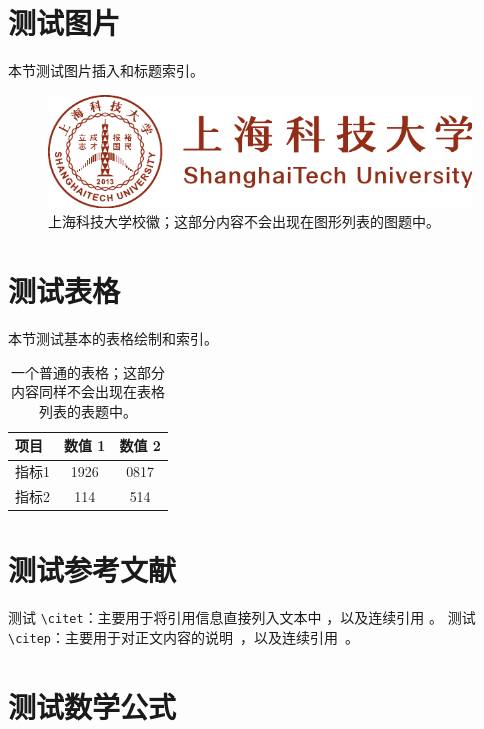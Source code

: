 \documentclass[
  fontset = mac,
]{shtthesis}
\begin{document}
\section{测试图片}
本节测试图片插入和标题索引。

\begin{figure}[htb]
  \centering
  \includegraphics[width=0.75\columnwidth]{shanghaitech-logo.pdf}
  \caption[上海科技大学校徽]{上海科技大学校徽；这部分内容不会出现在图形列表的图题中。}
\end{figure}

\section{测试表格}
本节测试基本的表格绘制和索引。

\begin{table}[htb]
  \centering
  \caption[一个普通的表格]{一个普通的表格；这部分内容同样不会出现在表格列表的表题中。}
  \begin{tabular}{lcc}
    \hline
    项目 & 数值 1 & 数值 2 \\
    \hline
    指标1 & 1926 & 0817 \\
    指标2 & 114  & 514 \\
    \hline
  \end{tabular}
\end{table}

\section{测试参考文献}
测试 \verb|\citet|：主要用于将引用信息直接列入文本中 \citet{wikibook2014latex}，以及连续引用 \citet{lamport1986document, chen2005zhulu}。
测试 \verb|\citep|：主要用于对正文内容的说明~\citep{chu2004tushu}，以及连续引用~\citep{stamerjohanns2009mathml, betts2005aging}。

\section{测试数学公式}
\end{document}
